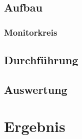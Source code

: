 \documentclass[11pt, ngerman, fleqn, DIV=15, headinclude, BCOR=2cm]{scrreprt}
\begin{document}
\section{Aufbau}

\subsection{Monitorkreis}

\section{Durchführung}

\section{Auswertung}

\chapter{Ergebnis}
\end{document}

